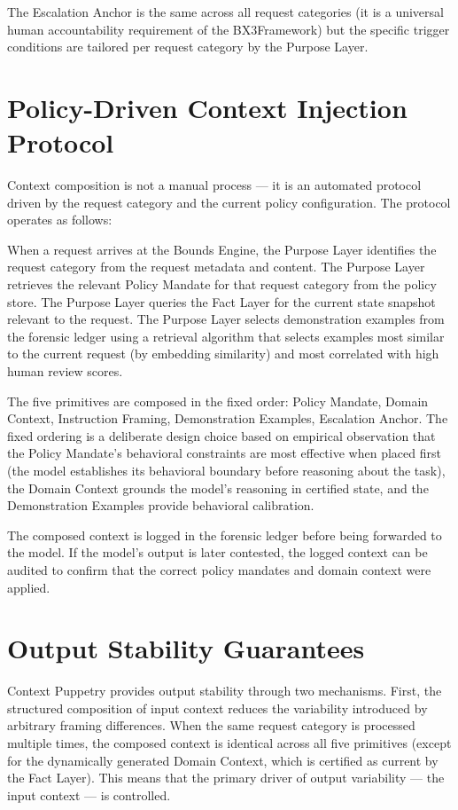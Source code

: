 \documentclass[12pt]{article}
\def\bxthree{BX3}
\begin{document}
The Escalation Anchor is the same across all request categories (it is a universal human accountability requirement of the \bxthree Framework) but the specific trigger conditions are tailored per request category by the Purpose Layer.

\section{Policy-Driven Context Injection Protocol}
Context composition is not a manual process --- it is an automated protocol driven by the request category and the current policy configuration. The protocol operates as follows:

When a request arrives at the Bounds Engine, the Purpose Layer identifies the request category from the request metadata and content. The Purpose Layer retrieves the relevant Policy Mandate for that request category from the policy store. The Purpose Layer queries the Fact Layer for the current state snapshot relevant to the request. The Purpose Layer selects demonstration examples from the forensic ledger using a retrieval algorithm that selects examples most similar to the current request (by embedding similarity) and most correlated with high human review scores.

The five primitives are composed in the fixed order: Policy Mandate, Domain Context, Instruction Framing, Demonstration Examples, Escalation Anchor. The fixed ordering is a deliberate design choice based on empirical observation that the Policy Mandate's behavioral constraints are most effective when placed first (the model establishes its behavioral boundary before reasoning about the task), the Domain Context grounds the model's reasoning in certified state, and the Demonstration Examples provide behavioral calibration.

The composed context is logged in the forensic ledger before being forwarded to the model. If the model's output is later contested, the logged context can be audited to confirm that the correct policy mandates and domain context were applied.

\section{Output Stability Guarantees}
Context Puppetry provides output stability through two mechanisms. First, the structured composition of input context reduces the variability introduced by arbitrary framing differences. When the same request category is processed multiple times, the composed context is identical across all five primitives (except for the dynamically generated Domain Context, which is certified as current by the Fact Layer). This means that the primary driver of output variability --- the input context --- is controlled.
\end{document}
